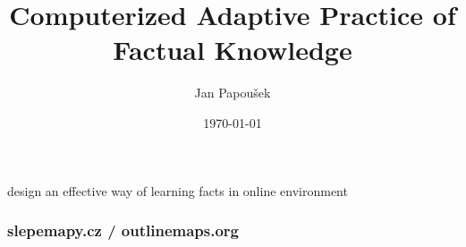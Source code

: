 \documentclass[xcolor=svgnames]{beamer}
\title{Computerized Adaptive Practice of Factual Knowledge}
\author{Jan Papou\v{s}ek}
\institute{Masaryk University Brno}
\date{\today}
\begin{document}
\frame[plain]{\titlepage}
\begin{frame}
	\begin{center}
	\huge design an effective way of learning facts in online environment
	\end{center}
\end{frame}
\begin{frame}
	\frametitle{slepemapy.cz / outlinemaps.org}
	\begin{center}
	\end{center}
\end{frame}
\end{document}
